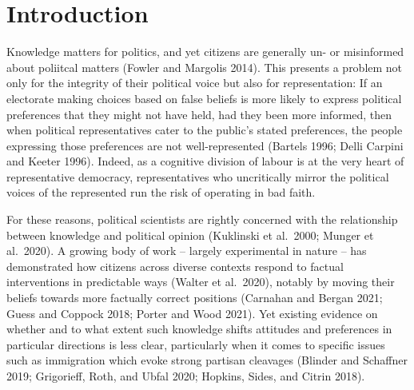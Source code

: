 \documentclass[11pt,halfline,a4paper,]{ouparticle}
\begin{document}
\date{\today}


\maketitle



\hypertarget{introduction}{%
\section{Introduction}\label{introduction}}

Knowledge matters for politics, and yet citizens are generally un- or
misinformed about poliitcal matters (Fowler and Margolis 2014). This
presents a problem not only for the integrity of their political voice
but also for representation: If an electorate making choices based on
false beliefs is more likely to express political preferences that they
might not have held, had they been more informed, then when political
representatives cater to the public's stated preferences, the people
expressing those preferences are not well-represented (Bartels 1996;
Delli Carpini and Keeter 1996). Indeed, as a cognitive division of
labour is at the very heart of representative democracy, representatives
who uncritically mirror the political voices of the represented run the
risk of operating in bad faith.

For these reasons, political scientists are rightly concerned with the
relationship between knowledge and political opinion (Kuklinski et
al.~2000; Munger et al.~2020). A growing body of work -- largely
experimental in nature -- has demonstrated how citizens across diverse
contexts respond to factual interventions in predictable ways (Walter et
al.~2020), notably by moving their beliefs towards more factually
correct positions (Carnahan and Bergan 2021; Guess and Coppock 2018;
Porter and Wood 2021). Yet existing evidence on whether and to what
extent such knowledge shifts attitudes and preferences in particular
directions is less clear, particularly when it comes to specific issues
such as immigration which evoke strong partisan cleavages (Blinder and
Schaffner 2019; Grigorieff, Roth, and Ubfal 2020; Hopkins, Sides, and
Citrin 2018).
\end{document}
